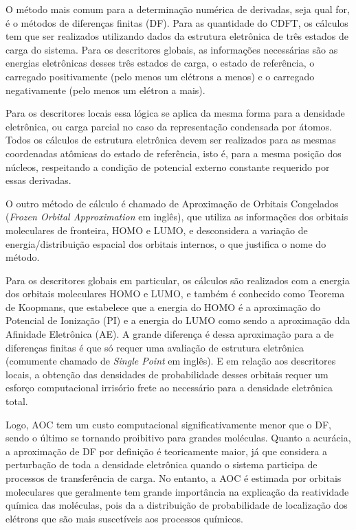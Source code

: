 \documentclass[a4paper,11pt]{refart}
\begin{document}
O método mais comum para a determinação numérica de derivadas, seja qual for, é o métodos de diferenças finitas (DF). Para as quantidade do CDFT, os cálculos tem que ser realizados utilizando dados da estrutura eletrônica de três estados de carga do sistema. Para os descritores globais, as informações necessárias são as energias eletrônicas desses três estados de carga, o estado de referência, o carregado positivamente (pelo menos um elétrons a menos) e o carregado negativamente (pelo menos um elétron a mais).

Para os descritores locais essa lógica se aplica da mesma forma para a densidade eletrônica, ou carga parcial no caso da representação condensada por átomos. Todos os cálculos de estrutura eletrônica devem ser realizados para as mesmas coordenadas atômicas do estado de referência, isto é, para a mesma posição dos núcleos, respeitando a condição de potencial externo constante requerido por essas derivadas.  

O outro método de cálculo é chamado de Aproximação de Orbitais Congelados (\textit{Frozen Orbital Approximation} em inglês)\cite{yang1984electron}, que utiliza as informações dos orbitais moleculares de fronteira, HOMO e LUMO, e desconsidera a variação de energia/distribuição espacial dos orbitais internos, o que justifica o nome do método. 

Para os descritores globais em particular, os cálculos são realizados com a energia dos orbitais moleculares HOMO e LUMO, e também é conhecido como Teorema de Koopmans\cite{manne1970koopmans}, que estabelece que a energia do HOMO é a aproximação do Potencial de Ionização (PI) e a energia do LUMO como sendo a aproximação dda Afinidade Eletrônica (AE). A grande diferença é dessa aproximação para a de diferenças finitas é que só requer uma avaliação de estrutura eletrônica (comumente chamado de \textit{Single Point} em inglês). E em relação aos descritores locais, a obtenção das densidades de probabilidade desses orbitais requer um esforço computacional irrisório frete ao necessário para a densidade eletrônica total. 

Logo, AOC tem um custo computacional significativamente menor que o DF, sendo o último se tornando proibitivo para grandes moléculas. Quanto a acurácia, a aproximação de DF por definição é teoricamente maior, já que considera a perturbação de toda a densidade eletrônica quando o sistema participa de processos de transferência de carga. No entanto, a AOC é estimada por orbitais moleculares que geralmente tem grande importância na explicação da reatividade química das moléculas, pois da a distribuição de probabilidade de localização dos elétrons que são mais suscetíveis aos processos químicos.   
\end{document}

